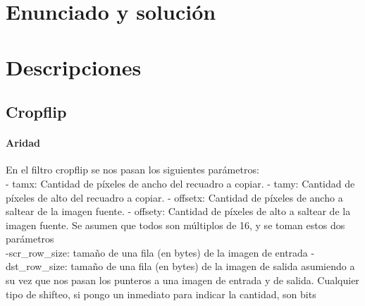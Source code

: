 \documentclass[a4paper]{article}
\newenvironment{codesnippet}{%
	\begin{Sbox}\begin{minipage}{\textwidth}\sffamily\small}%
	{\end{minipage}\end{Sbox}%
		\begin{center}%
		\vspace{-0.4cm}\colorbox{litegrey}{\TheSbox}\end{center}\vspace{0.3cm}}
\begin{document}
        
\section{Enunciado y solución} 
%
\section{Descripciones}
\subsection{Cropflip}
\paragraph{\textbf{Aridad}}
En el filtro cropflip se nos pasan los siguientes parámetros:
\hfill \break
\\
- tamx: Cantidad de píxeles de ancho del recuadro a copiar.
\hfill \break
- tamy: Cantidad de píxeles de alto del recuadro a copiar.
\hfill \break
- offsetx: Cantidad de píxeles de ancho a saltear de la imagen fuente.
\hfill \break
- offsety: Cantidad de píxeles de alto a saltear de la imagen fuente.
\hfill \break
Se asumen que todos son múltiplos de 16, y se toman estos dos parámetros
\hfill \break
\\
-scr_row_size: tamaño de una fila (en bytes) de la imagen de entrada
\hfill \break
-dst_row_size: tamaño de una fila (en bytes) de la imagen de salida
\hfill \break
asumiendo a su vez que nos pasan los punteros a una imagen de entrada y de salida. Cualquier tipo de shifteo, si pongo un inmediato para indicar la cantidad, son bits
\hfill \break
\end{document}
